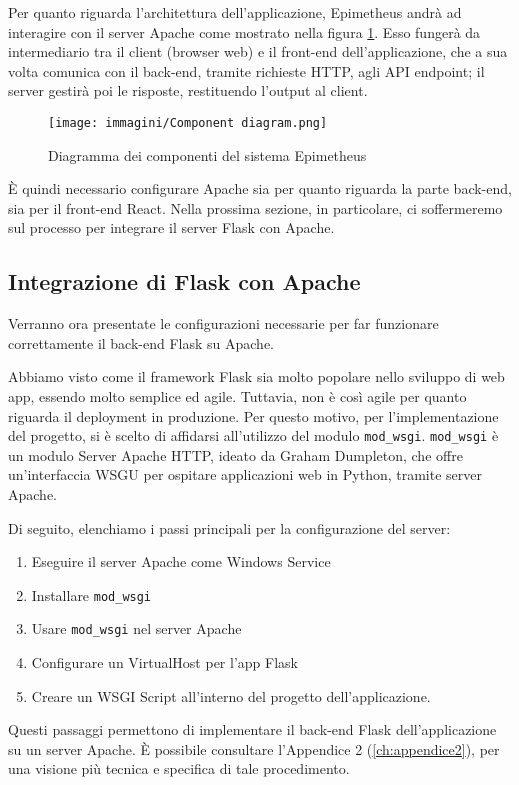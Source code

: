 Per quanto riguarda  l'architettura dell'applicazione, Epimetheus andrà ad interagire con il server Apache come mostrato nella figura \ref{fig:component}. Esso fungerà da intermediario tra il client (browser web) e il front-end dell'applicazione, che a sua volta comunica con il back-end, tramite richieste HTTP, agli API endpoint; il server gestirà poi le risposte, restituendo l’output al client.

\begin{figure}
    \centering
    \texttt{[image: immagini/Component diagram.png]}
    \caption{Diagramma dei componenti del sistema Epimetheus}
    \label{fig:component}
\end{figure}
È quindi necessario configurare Apache sia per quanto riguarda la parte back-end, sia per il front-end React. 
\newline
Nella prossima sezione, in particolare, ci soffermeremo sul processo per integrare il server Flask con Apache.

\subsection{Integrazione di Flask con Apache}

Verranno ora presentate le configurazioni necessarie per far funzionare correttamente il back-end Flask su Apache. 

Abbiamo visto come il framework Flask sia molto popolare nello sviluppo di web app, essendo molto semplice ed agile. Tuttavia, non è così agile per quanto riguarda il deployment in produzione.
\newline
Per questo motivo, per l’implementazione del progetto, si è scelto di affidarsi all'utilizzo del modulo \verb|mod_wsgi|.
\newline
\verb|mod_wsgi| è un modulo Server Apache HTTP, ideato da Graham Dumpleton, che offre un’interfaccia WSGU per ospitare applicazioni web in Python, tramite server Apache.

Di seguito, elenchiamo i passi principali per la configurazione del server: 

\begin{enumerate}
    \item Eseguire il server Apache come Windows Service
    \item Installare \verb|mod_wsgi|
    \item Usare \verb|mod_wsgi| nel server Apache
    \item Configurare un VirtualHost per l’app Flask
    \item Creare un WSGI Script all'interno del progetto dell'applicazione.
\end{enumerate}
Questi passaggi permettono di implementare il back-end Flask dell'applicazione su un server Apache.
\newline
È possibile consultare l’Appendice 2 (\ref{ch:appendice2}), per una visione più tecnica e specifica di tale procedimento.

